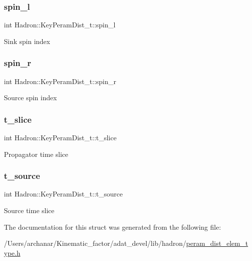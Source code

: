 \subsubsection{\texorpdfstring{spin\_l}{spin\_l}}
{\footnotesize\ttfamily int Hadron\+::\+Key\+Peram\+Dist\+\_\+t\+::spin\+\_\+l}

Sink spin index \mbox{\label{structHadron_1_1KeyPeramDist__t_ae222119223bd2bdd94a9ce4c08807dc3}} 
\subsubsection{\texorpdfstring{spin\_r}{spin\_r}}
{\footnotesize\ttfamily int Hadron\+::\+Key\+Peram\+Dist\+\_\+t\+::spin\+\_\+r}

Source spin index \mbox{\label{structHadron_1_1KeyPeramDist__t_a87f2be4569ea23f3aa0d3560fc0ddcb5}} 
\subsubsection{\texorpdfstring{t\_slice}{t\_slice}}
{\footnotesize\ttfamily int Hadron\+::\+Key\+Peram\+Dist\+\_\+t\+::t\+\_\+slice}

Propagator time slice \mbox{\label{structHadron_1_1KeyPeramDist__t_a71636c4b4d1d7b0be579f932d54ceb35}} 
\subsubsection{\texorpdfstring{t\_source}{t\_source}}
{\footnotesize\ttfamily int Hadron\+::\+Key\+Peram\+Dist\+\_\+t\+::t\+\_\+source}

Source time slice 

The documentation for this struct was generated from the following file\+:\begin{DoxyCompactItemize}
\item 
/\+Users/archanar/\+Kinematic\+\_\+factor/adat\+\_\+devel/lib/hadron/\mbox{\hyperlink{lib_2hadron_2peram__dist__elem__type_8h}{peram\+\_\+dist\+\_\+elem\+\_\+type.\+h}}\end{DoxyCompactItemize}
